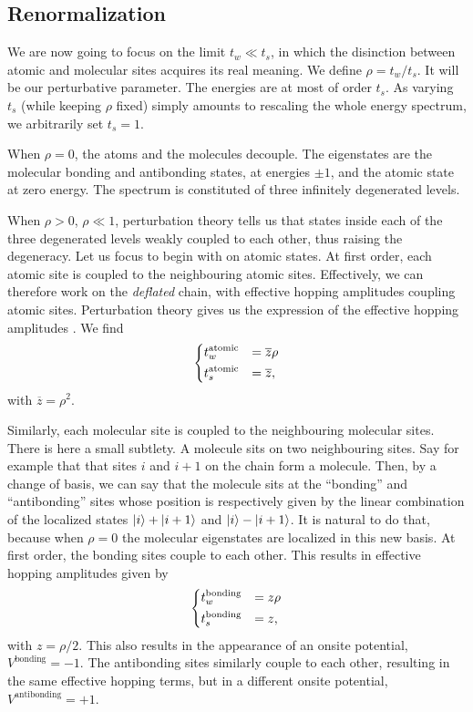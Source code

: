 \documentclass[11pt]{article}
\newcommand{\zb}{\ensuremath{\overline{z}}}
\begin{document}
\subsection{Renormalization}

We are now going to focus on the limit $t_w \ll t_s$, in which the disinction between atomic and molecular sites acquires its real meaning.
We define $\rho = t_w/t_s$. It will be our perturbative parameter.
The energies are at most of order $t_s$. As varying $t_s$ (while keeping $\rho$ fixed) simply amounts to rescaling the whole energy spectrum, we arbitrarily set $t_s = 1$. 

When $\rho = 0$, the atoms and the molecules decouple. The eigenstates are the molecular bonding and antibonding states, at energies $\pm 1$, and the atomic state at zero energy.
The spectrum is constituted of three infinitely degenerated levels.

When $\rho > 0$, $\rho \ll 1$, perturbation theory tells us that states inside each of the three degenerated levels weakly coupled to each other, thus raising the degeneracy.
Let us focus to begin with on atomic states. At first order, each atomic site is coupled to the neighbouring atomic sites.
Effectively, we can therefore work on the \emph{deflated} chain, with effective hopping amplitudes coupling atomic sites. Perturbation theory gives us the expression of the effective hopping amplitudes \cite{Niu1990}.
We find
\begin{equation}
	\begin{dcases}
	t^\text{atomic}_w &= \zb \rho\\
	t^\text{atomic}_s &= \zb,
	\end{dcases}
\end{equation}
with $\zb =\rho^2$.

Similarly, each molecular site is coupled to the neighbouring molecular sites. 
There is here a small subtlety. A molecule sits on two neighbouring sites. Say for example that that sites $i$ and $i+1$ on the chain form a molecule.
Then, by a change of basis, we can say that the molecule sits at the ``bonding'' and ``antibonding'' sites whose position is respectively given by the linear combination of the localized states $\ket{i} + \ket{i+1}$ and $\ket{i} - \ket{i+1}$.
It is natural to do that, because when $\rho = 0$ the molecular eigenstates are localized in this new basis.
At first order, the bonding sites couple to each other. 
This results in effective hopping amplitudes given by
\begin{equation}
	\begin{dcases}
	t^\text{bonding}_w &= z \rho\\
	t^\text{bonding}_s &= z,
	\end{dcases}
\end{equation}
with $z = \rho/2$. This also results in the appearance of an onsite potential, $V^\text{bonding}  = -1$. 
The antibonding sites similarly couple to each other, resulting in the same effective hopping terms, but in a different onsite potential, $V^\text{antibonding} = +1$.
\end{document}
